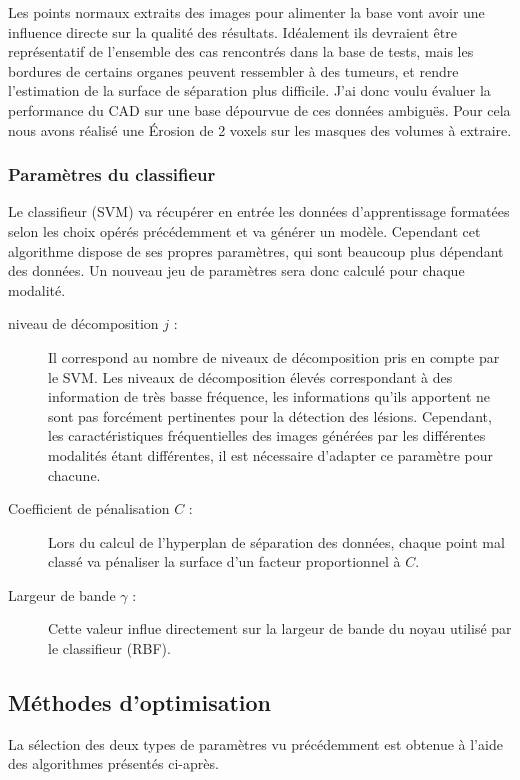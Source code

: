 Les points normaux extraits des images pour alimenter la base vont avoir une influence directe sur la qualité des résultats. Idéalement ils devraient être représentatif de l'ensemble des cas rencontrés dans la base de tests, mais les bordures de certains organes peuvent ressembler à des tumeurs, et rendre l'estimation de la surface de séparation plus difficile. J'ai donc voulu évaluer la performance du CAD sur une base dépourvue de ces données ambiguës. Pour cela nous avons réalisé une Érosion de 2 voxels sur les masques des volumes à extraire.

\subsubsection{Paramètres du classifieur}

Le classifieur (SVM) va récupérer en entrée les données d'apprentissage formatées selon les choix opérés précédemment et va générer un modèle. Cependant cet algorithme dispose de ses propres paramètres, qui sont beaucoup plus dépendant des données. Un nouveau jeu de paramètres sera donc calculé pour chaque modalité.

\begin{description}
 \item[niveau de décomposition $j$ :] Il correspond au nombre de niveaux de décomposition pris en compte par le SVM. Les niveaux de décomposition élevés correspondant à des information de très basse fréquence, les informations qu'ils apportent ne sont pas forcément pertinentes pour la détection des lésions. Cependant, les caractéristiques fréquentielles des images générées par les différentes modalités étant différentes, il est nécessaire d'adapter ce paramètre pour chacune.
 \item[Coefficient de pénalisation $C$ :] Lors du calcul de l'hyperplan de séparation des données, chaque point mal classé va pénaliser la surface d'un facteur proportionnel à $C$.
 \item[Largeur de bande $\gamma$ :] Cette valeur influe directement sur la largeur de bande du noyau utilisé par le classifieur (RBF).
\end{description}

\subsection{Méthodes d'optimisation}

La sélection des deux types de paramètres vu précédemment est obtenue à l'aide des algorithmes présentés ci-après. 

